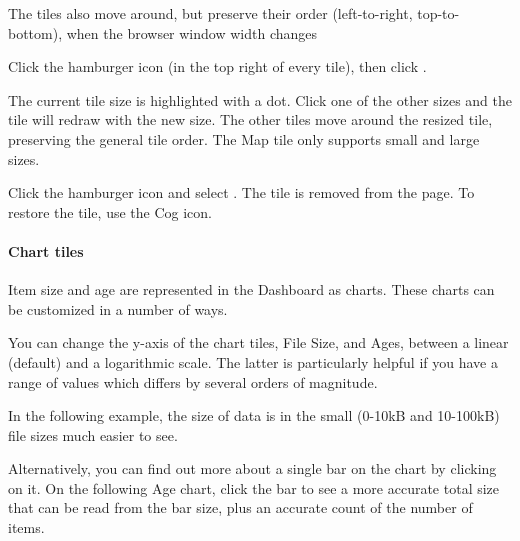 \documentclass[letterpaper,10pt,english]{sphinxmanual}
\begin{document}
The tiles also move around, but preserve their order (left-to-right, top-to-bottom), when the browser window width changes


Click the hamburger icon  (in the top right of every tile), then click .

The current tile size is highlighted with a dot. Click one of the other sizes and the tile will redraw with the new size. The other tiles move around the resized tile, preserving the general tile order.
The Map tile only supports small and large sizes.


Click the hamburger icon and select . The tile is removed from the page.
To restore the tile, use the Cog icon.
\begin{quote}
\label{\detokenize{mcdmp_app_ug:chart-tiles}}\end{quote}


\paragraph{Chart tiles}
\label{\detokenize{mcdmp_app_ug:chart-tiles}}\label{\detokenize{mcdmp_app_ug:id2}}
Item size and age are represented in the Dashboard as charts. These charts can be customized in a number of ways.

You can change the y-axis of the chart tiles, File Size, and Ages, between a linear (default) and a logarithmic scale. The latter is particularly helpful if you have a range of values which differs by several orders of magnitude.

In the following example, the size of data is in the small (0-10kB and 10-100kB) file sizes much easier to see.
\begin{quote}

\begin{figure}[htbp]
\centering

\noindent{}
\end{figure}
\end{quote}

Alternatively, you can find out more about a single bar on the chart by clicking on it. On the following Age chart, click the bar to see a more accurate total size that can be read from the bar size, plus an accurate count of the number of items.
\begin{quote}

\begin{figure}[htbp]
\centering

\noindent{}
\end{figure}
\label{\detokenize{mcdmp_app_ug:list-titles}}\end{quote}
\end{document}
